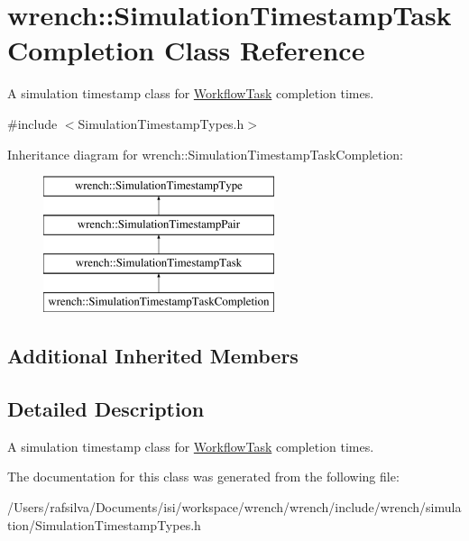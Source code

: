 \hypertarget{classwrench_1_1_simulation_timestamp_task_completion}{}\section{wrench\+:\+:Simulation\+Timestamp\+Task\+Completion Class Reference}
\label{classwrench_1_1_simulation_timestamp_task_completion}


A simulation timestamp class for \hyperlink{classwrench_1_1_workflow_task}{Workflow\+Task} completion times.  




{\ttfamily \#include $<$Simulation\+Timestamp\+Types.\+h$>$}

Inheritance diagram for wrench\+:\+:Simulation\+Timestamp\+Task\+Completion\+:\begin{figure}[H]
\begin{center}
\leavevmode
\includegraphics[height=4.000000cm]{classwrench_1_1_simulation_timestamp_task_completion}
\end{center}
\end{figure}
\subsection*{Additional Inherited Members}


\subsection{Detailed Description}
A simulation timestamp class for \hyperlink{classwrench_1_1_workflow_task}{Workflow\+Task} completion times. 

The documentation for this class was generated from the following file\+:\begin{DoxyCompactItemize}
\item 
/\+Users/rafsilva/\+Documents/isi/workspace/wrench/wrench/include/wrench/simulation/Simulation\+Timestamp\+Types.\+h\end{DoxyCompactItemize}
